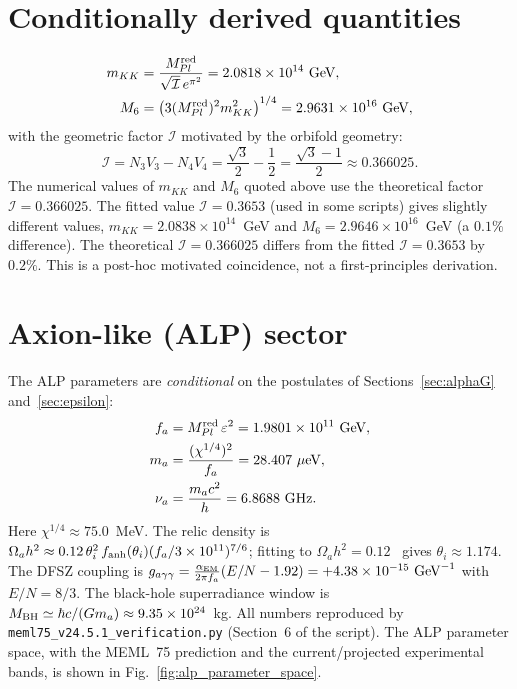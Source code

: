 \documentclass[12pt,a4paper]{article}
\numberwithin{equation}{section}
\begin{document}
\section{Conditionally derived quantities}
\label{sec:derived}
\begin{align}
m_{KK} &= \frac{M_{Pl}^{\rm red}}{\sqrt{\mathcal{I}}\,e^{\pi^2}} = 2.0818\times10^{14}~\text{GeV}, \\
M_6 &= \left(3 (M_{Pl}^{\rm red})^2 m_{KK}^2\right)^{1/4} = 2.9631\times10^{16}~\text{GeV},
\end{align}
with the geometric factor \(\mathcal{I}\) motivated by the orbifold
geometry:
\begin{equation}
\mathcal{I} = N_3 V_3 - N_4 V_4 = \frac{\sqrt{3}}{2} - \frac{1}{2} = \frac{\sqrt{3}-1}{2} \approx 0.366025.
\end{equation}
The numerical values of \(m_{KK}\) and \(M_6\) quoted above use the
theoretical factor \(\mathcal{I} = 0.366025\). The fitted value
\(\mathcal{I} = 0.3653\) (used in some scripts) gives slightly different
values, \(m_{KK} = 2.0838\times10^{14}\)~GeV and
\(M_6 = 2.9646\times10^{16}\)~GeV (a \(0.1\%\) difference).
The theoretical \(\mathcal{I}=0.366025\) differs from the fitted
\(\mathcal{I}=0.3653\) by \(0.2\%\).
This is a post-hoc motivated coincidence, not a first-principles
derivation.

\section{Axion-like (ALP) sector}
\label{sec:alp}
The ALP parameters are \emph{conditional} on the postulates of
Sections~\ref{sec:alphaG} and~\ref{sec:epsilon}:
\begin{align}
f_a &= M_{Pl}^{\rm red}\,\varepsilon^2 = 1.9801\times10^{11}~\text{GeV}, \\
m_a &= \frac{(\chi^{1/4})^2}{f_a} = 28.407~\mu\text{eV}, \\
\nu_a &= \frac{m_a c^2}{h} = 6.8688~\text{GHz}.
\end{align}
Here \(\chi^{1/4} \approx 75.0\)~MeV. The relic density is
\(\Omega_a h^2 \approx 0.12\,\theta_i^2\, f_{\rm anh}(\theta_i)(f_a/3\times10^{11})^{7/6}\);
fitting to \(\Omega_a h^2 = 0.12\)~\cite{Planck2018} gives
\(\theta_i \approx 1.174\). The DFSZ coupling is
\(g_{a\gamma\gamma} = \frac{\alpha_{\rm EM}}{2\pi f_a}(E/N-1.92) = +4.38\times10^{-15}~\text{GeV}^{-1}\)
with \(E/N=8/3\). The black-hole superradiance window is
\(M_{\rm BH} \simeq \hbar c/(G m_a) \approx 9.35\times10^{24}\)~kg.
All numbers reproduced by \texttt{meml75\_v24.5.1\_verification.py}
(Section~6 of the script). The ALP parameter space, with the MEML~75
prediction and the current/projected experimental bands, is shown in
Fig.~\ref{fig:alp_parameter_space}.
\end{document}
